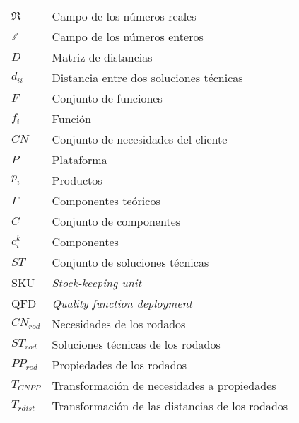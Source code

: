 \noindent 
\begin{center}
\begin{tabular}{lp{15cm}}
$\Re$ & Campo de los números reales\\
$\mathbb{Z}$ & Campo de los números enteros\\
$D$ & Matriz de distancias \\
$d_{ii}$ & Distancia entre dos soluciones técnicas\\
$F$ & Conjunto de funciones\\
$f_i$ & Función\\
$CN$ & Conjunto de necesidades del cliente\\
$P$ & Plataforma\\
$p_i$ & Productos\\
$\Gamma$ & Componentes teóricos\\
$C$ & Conjunto de componentes\\
$c_{i}^{k}$ & Componentes\\
$ST$ & Conjunto de soluciones técnicas\\
SKU & \textit{Stock-keeping unit}\\
QFD & \textit{Quality function deployment}\\
$CN_{rod}$ & Necesidades de los rodados\\
$ST_{rod}$ & Soluciones técnicas de los rodados\\
$PP_{rod}$ & Propiedades de los rodados\\
$T_{CNPP}$ & Transformación de necesidades a propiedades\\
$T_{rdist}$ & Transformación de las distancias de los rodados
\end{tabular}
\end{center}